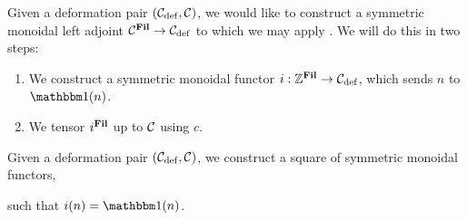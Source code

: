 Given a deformation pair $(\mathcal{C}_{\mathrm{def}}, \mathcal{C})$, we would like to construct a symmetric monoidal left adjoint
$ \mathcal{C}^{\operatorname{\mathbf{Fil}}} \to \mathcal{C}_{\mathrm{def}} $
to which we may apply .
We will do this in two steps:
\begin{enumerate}
\item We construct a symmetric monoidal functor $i : \mathbb{Z}^{\operatorname{\mathbf{Fil}}} \to \mathcal{C}_{\mathrm{def}}$, which sends $n$ to $\o(n)$.
\item We tensor $i^{\operatorname{\mathbf{Fil}}}$ up to $\mathcal{C}$ using $c$.
\end{enumerate}



\begin{cnstr} \label{lem:fil-build}
  Given a deformation pair $(\mathcal{C}_{\mathrm{def}}, \mathcal{C})$, we construct a square of symmetric monoidal functors,
  \begin{center}  \end{center}
  such that $i(n) = \o(n)$.
\end{cnstr}
  
